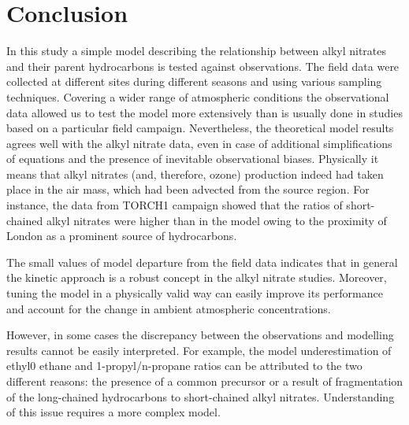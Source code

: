 \documentclass[11pt,a4paper]{article}
\begin{document}
\section{Conclusion} \label{sec:conclusion}
In this study a simple model describing the relationship between alkyl nitrates and their parent hydrocarbons is tested against observations. The field data were collected at different sites during different seasons and using various sampling techniques. Covering a wider range of atmospheric conditions the observational data allowed us to test the model more extensively than is usually done in studies based on a particular field campaign. Nevertheless, the theoretical model results agrees well with the alkyl nitrate data, even in case of additional simplifications of equations and the presence of inevitable observational biases. Physically it means that alkyl nitrates (and, therefore, ozone) production indeed had taken place in the air mass, which had been advected from the source region. For instance, the data from TORCH1 campaign showed that the ratios of short-chained alkyl nitrates were higher than in the model owing to the proximity of London as a prominent source of hydrocarbons.

The small values of model departure from the field data indicates that in general the kinetic approach is a robust concept in the alkyl nitrate studies. Moreover, tuning the model in a physically valid way can easily improve its performance and account for the change in ambient atmospheric concentrations. 

However, in some cases the discrepancy between the observations and modelling results cannot be easily interpreted. For example, the model underestimation of ethyl0 ethane and 1-propyl/n-propane ratios can be attributed to  the two different reasons: the presence of a common precursor or a result of fragmentation of the long-chained hydrocarbons to short-chained alkyl nitrates. Understanding of this issue requires a more complex model.


\end{document}
